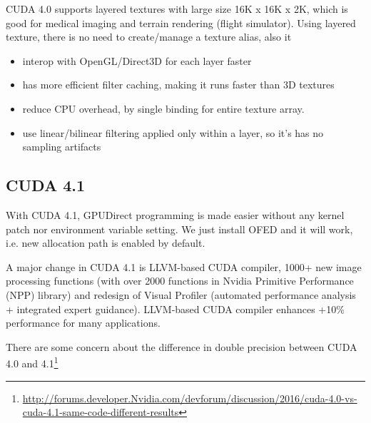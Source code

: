  CUDA 4.0 supports layered textures with large size 16K x 16K x 2K, which is
 good for medical imaging and terrain rendering (flight simulator). Using
 layered texture, there is no need to create/manage a texture alias, also it 
 \begin{itemize}
   \item interop with OpenGL/Direct3D for each layer faster
   \item has more efficient filter caching, making it runs faster than 3D
   textures
   \item reduce CPU overhead, by single binding for entire texture array.
   \item use linear/bilinear filtering applied only within a layer, so it's has
   no sampling artifacts
 \end{itemize}

 

\subsection{CUDA 4.1}
\label{sec:CUDA_41}


With CUDA 4.1, GPUDirect programming is made easier without any kernel patch
nor environment variable setting. We just install OFED and it will work, i.e.
new allocation path is enabled by default.

A major change in CUDA 4.1 is LLVM-based CUDA compiler, 1000+ new image
processing functions (with over 2000 functions in Nvidia Primitive Performance
(NPP) library) and redesign of Visual Profiler (automated performance analysis +
integrated expert guidance). LLVM-based CUDA compiler enhances +10\% performance
for many applications. 

There are some concern about the difference in double precision between CUDA 4.0
and
4.1\footnote{\url{http://forums.developer.Nvidia.com/devforum/discussion/2016/cuda-4.0-vs-cuda-4.1-same-code-different-results}}

